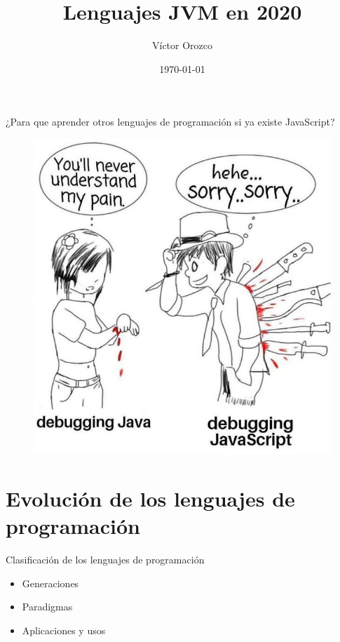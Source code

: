 \documentclass[aspectratio=169]{beamer}
\title{Lenguajes JVM en 2020}
\author{Víctor Orozco}
\institute{Academik}
\date{\today}
\begin{document}
{
    \frame{\titlepage}
}


\begin{frame}
    \huge ¿Para que aprender otros lenguajes de programación si ya existe JavaScript?
\end{frame}


\begin{frame}
    \begin{figure}
        \centering
        \includegraphics[width=0.5\linewidth]{Images/javavsjs}
    \end{figure}
\end{frame}

\section{Evolución de los lenguajes de programación}

\begin{frame}{Clasificación de los lenguajes de programación}
	\begin{itemize}
		\item Generaciones
		\item Paradigmas
		\item Aplicaciones y usos
	\end{itemize}
\end{frame}
\end{document}
